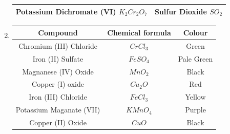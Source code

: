 \documentclass[oneside]{book}
\begin{document}
\begin{enumerate}
\begin{center}
\begin{tabular}{ |c|c| }
            \hline
            Potassium Dichromate (VI) \(K_2Cr_2O_7\) & Sulfur Dioxide \(SO_2\)\\
            \hline
        \end{tabular}
        \end{center}
        \item
    \begin{center}
        \begin{tabular}{ |c|c|c| }  
            \hline
            \color{blue} Compound & \color{blue} Chemical formula & \color{blue} Colour\\
            \hline
            Chromium (III) Chloride & \( CrCl_3 \) & Green\\
            \hline
            Iron (II) Sulfate & \(FeSO_4\) & Pale Green\\
            \hline
            Magnanese (IV) Oxide & \(MnO_2\) & Black\\
            \hline
            Copper (I) oxide & \(Cu_2O\) & Red\\
            \hline
            Iron (III) Chloride & \(FeCl_3\) & Yellow\\
            \hline
            Potassium Maganate (VII) & \(KMnO_4\) & Purple\\
            \hline
            Copper (II) Oxide & \(CuO\) & Black\\
            \hline
        \end{tabular}
        \end{center}
\end{enumerate}
\end{document}
